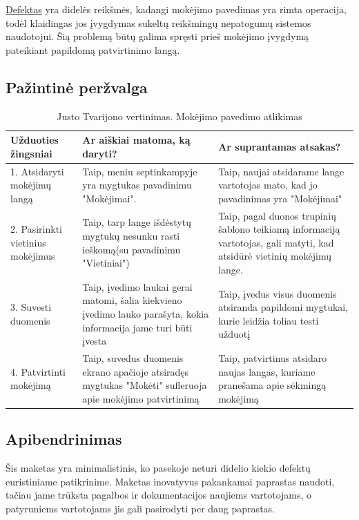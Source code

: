 \documentclass[oneside]{VUMIFPSkursinis}
\begin{document}
\hyperref[lentele:klaiduPrevencijaM]{Defektas} yra didelės reikšmės, kadangi mokėjimo pavedimas yra rimta operacija, todėl klaidingas jos įvygdymas sukeltų reikšmingų nepatogumų sistemos naudotojui. Šią problemą būtų galima spręsti prieš mokėjimo įvygdymą pateikiant papildomą patvirtinimo langą.
\subsection{Pažintinė peržvalga}

\begin{center}
\begin{longtable}[!htb]{|p{5cm}|p{5cm}|p{5cm}|}
	\caption{Justo Tvarijono vertinimas. Mokėjimo pavedimo atlikimas}
\endfirsthead
\endhead
	\hline
	Užduoties žingsniai & Ar aiškiai matoma, ką daryti? & Ar suprantamas atsakas? \\ \hline
	1. Atsidaryti mokėjimų langą & Taip, meniu septinkampyje yra mygtukas pavadinimu "Mokėjimai".  & Taip, naujai atsidarame lange vartotojas mato, kad jo pavadinimas yra "Mokėjimai"  \\ \hline
	2. Pasirinkti vietinius mokėjimus & Taip, tarp lange išdėstytų mygtukų nesunku rasti ieškomą(su pavadinimu "Vietiniai") & Taip, pagal duonos trupinių šablono teikiamą informaciją vartotojas, gali matyti, kad atsidūrė vietinių mokėjimų lange. \\ \hline
	3. Suvesti duomenis & Taip, įvedimo laukai gerai matomi, šalia kiekvieno įvedimo lauko parašyta, kokia informacija jame turi būti įvesta & Taip, įvedus visus duomenis atsiranda papildomi mygtukai, kurie leidžia toliau testi užduotį \\ \hline
	4. Patvirtinti mokėjimą & Taip, suvedus duomenis ekrano apačioje atsiradęs mygtukas "Mokėti" sufleruoja apie mokėjimo patvirtinimą & Taip, patvirtinus atsidaro naujas langas, kuriame pranešama apie sėkmingą mokėjimą \\ \hline
\end{longtable}
\end{center}
\subsection{Apibendrinimas}
Šis maketas yra minimalistinis, ko pasekoje neturi didelio kiekio defektų euristiniame patikrinime. Maketas inovatyvus pakankamai paprastas naudoti, tačiau jame trūksta pagalbos ir dokumentacijos naujiems vartotojams, o patyruniems vartotojams jis gali pasirodyti per daug paprastas.
\end{document}
